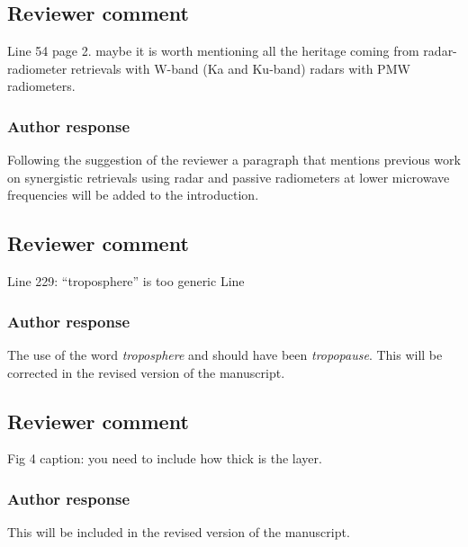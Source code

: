 \documentclass[11pt]{scrartcl}
\begin{document}
\subsection*{Reviewer comment}

Line 54 page 2.  maybe it is worth mentioning all the heritage coming from radar-radiometer retrievals with W-band (Ka and Ku-band) radars with PMW radiometers. 

\subsubsection*{Author response}

Following the suggestion of the reviewer a paragraph that mentions previous work
on synergistic retrievals using radar and passive radiometers at lower microwave
frequencies will be added to the introduction.

%
%


\subsection*{Reviewer comment}
Line 229: “troposphere” is too generic Line

\subsubsection*{Author response}

The use of the word {\itshape troposphere} and should have been {\itshape tropopause}.
This will be corrected in the revised version of the manuscript.

\subsection*{Reviewer comment}
Fig 4 caption: you need to include how thick is the layer.

\subsubsection*{Author response}
This will be included in the revised version of the manuscript.
\end{document}
